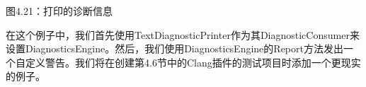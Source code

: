 \begin{center}
图4.21：打印的诊断信息
\end{center}

在这个例子中，我们首先使用TextDiagnosticPrinter作为其DiagnosticConsumer来设置DiagnosticsEngine。然后，我们使用DiagnosticsEngine的Report方法发出一个自定义警告。我们将在创建第4.6节中的Clang插件的测试项目时添加一个更现实的例子。

























































